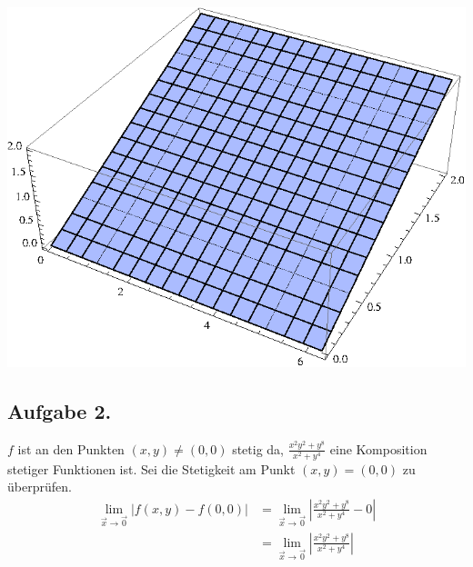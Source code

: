 \documentclass[10pt,a4paper]{scrartcl}
\begin{document}
\begin{enumerate}[(i)]
\begin{minipage}{0.50\columnwidth}
\includegraphics[scale=0.7]{1iv.eps} 
\end{minipage}
\end{enumerate}
\subsection*{Aufgabe 2.}
$f$ ist an den Punkten $(x,y) \neq (0,0)$ stetig da, $\frac{x^2y^2+y^8}{x^2+y^4}$ eine Komposition stetiger Funktionen ist. Sei die Stetigkeit am Punkt $(x,y) = (0,0)$ zu überprüfen.
\begin{align*}
\lim_{\vec{x} \to \vec{0}} \left| f(x,y) - f(0,0) \right| &= \lim_{\vec{x} \to \vec{0}} \left| \frac{x^2y^2+y^8}{x^2+y^4} - 0 \right| \\
 &= \lim_{\vec{x} \to \vec{0}} \left| \frac{x^2y^2+y^8}{x^2+y^4}\right|
\end{align*}
\end{document}
